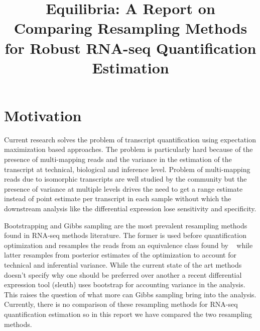 \documentclass{article}
\begin{document}





\title{{Equilibria: A Report on Comparing Resampling Methods for Robust RNA-seq Quantification Estimation}\\ \bigskip}

\date{}

\maketitle
{}

\section{Motivation}
Current research solves the problem of transcript quantification using expectation maximization based approaches.
The problem is particularly hard because of the presence of multi-mapping reads and the variance in the estimation 
of the transcript at technical, biological and inference level. Problem of multi-mapping reads due to isomorphic transcripts
are well studied by the community but the presence of variance at multiple levels drives the need to get a range estimate 
instead of point estimate per transcript in each sample without which the downstream analysis like the differential expression 
lose sensitivity and specificity.

Bootstrapping and Gibbs sampling are the most prevalent resampling methods found in RNA-seq methods literature. The former is used
before quantification optimization and resamples the reads from an equivalence class found by ~\citep{Patro2016Salmon} while latter resamples from
posterior estimates of the optimization to account for technical and inferential variance. While the current state of the art methods doesn't
specify why one should be preferred over another a recent differential expression tool (sleuth) uses bootstrap for accounting
variance in the analysis. This raises the question of what more can Gibbs sampling bring into the analysis. Currently, there is no
comparison of these resampling methods for RNA-seq quantification estimation so in this report we have compared the two resampling methods.
\end{document}
